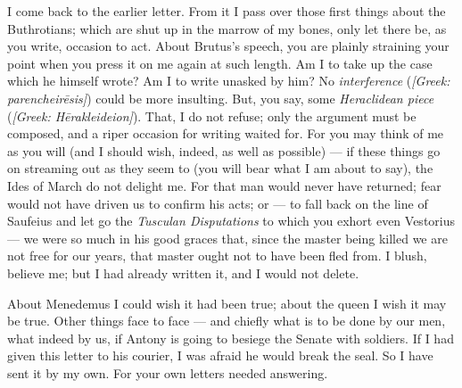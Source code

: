  I come back to the earlier letter. From it I pass over those first things about the Buthrotians; which are shut up in the marrow of my bones, only let there be, as you write, occasion to act. About Brutus's speech, you are plainly straining your point when you press it on me again at such length. Am I to take up the case which he himself wrote? Am I to write unasked by him? No \textit{interference} (\textit{[Greek: parencheir\=esis]}) could be more insulting. But, you say, some \textit{Heraclidean piece} (\textit{[Greek: H\=erakleideion]}). That, I do not refuse; only the argument must be composed, and a riper occasion for writing waited for. For you may think of me as you will (and I should wish, indeed, as well as possible) --- if these things go on streaming out as they seem to (you will bear what I am about to say), the Ides of March do not delight me. For that man would never have returned; fear would not have driven us to confirm his acts; or --- to fall back on the line of Saufeius and let go the \textit{Tusculan Disputations} to which you exhort even Vestorius --- we were so much in his good graces that, since the master being killed we are not free for our years, that master ought not to have been fled from. I blush, believe me; but I had already written it, and I would not delete.

 About Menedemus I could wish it had been true; about the queen I wish it may be true. Other things face to face --- and chiefly what is to be done by our men, what indeed by us, if Antony is going to besiege the Senate with soldiers. If I had given this letter to his courier, I was afraid he would break the seal. So I have sent it by my own. For your own letters needed answering.
